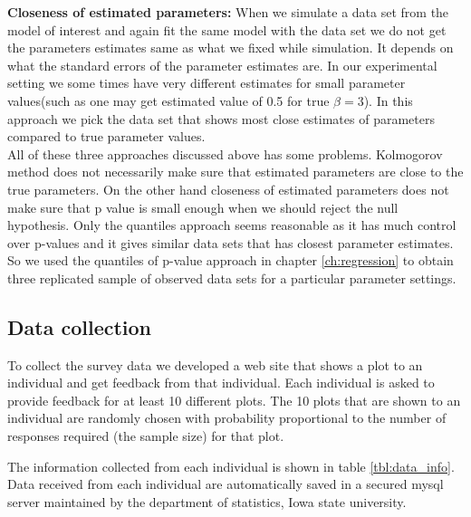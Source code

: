 \documentclass{article}
\begin{document}
{\bf Closeness of estimated parameters:} When we simulate a data set from the model of interest and again fit the same model with the data set we do not get the parameters estimates same as what we fixed while simulation. It depends on what the standard errors of the parameter estimates are. In our experimental setting we some times have very different estimates for small parameter values(such as one may get estimated value of 0.5 for true $\beta=3$). In this approach we pick the data set that shows most close estimates of parameters compared to true parameter values.\\

All of these three approaches discussed above has some problems. Kolmogorov method does not necessarily make sure that estimated parameters are close to the true parameters. On the other hand closeness of estimated parameters does not make sure that p value is small enough when we should reject the null hypothesis. Only the quantiles approach seems reasonable as it has much control over p-values and it gives similar data sets that has closest parameter estimates. So we used the quantiles of p-value approach in chapter \ref{ch:regression} to obtain three replicated sample of observed data sets for a particular parameter settings.\\

\subsection{Data collection} To collect the survey data we developed a web site that shows a plot to an individual and get feedback from that individual. Each individual is asked to provide feedback for at least 10 different plots. The 10 plots that are shown to an individual are randomly chosen with probability proportional to the number of responses required (the sample size) for that plot.

The information collected from each individual is shown in table \ref{tbl:data_info}. Data received from each individual are automatically saved in a secured mysql server maintained by the department of statistics, Iowa state university. 
\end{document}
